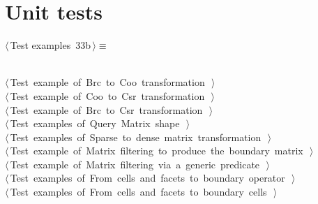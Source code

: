 \documentclass[11pt,oneside]{article}	%
\begin{document}

\section{Unit tests}


\begin{flushleft} \small \label{scrap57}
\protect{}$\langle\,$Test examples\nobreak\ {\footnotesize 33b}$\,\rangle\equiv$
\vspace{-1ex}
\begin{list}{}{} \item
\mbox{}\verb@@\\
\mbox{}\verb@@\hbox{$\langle\,$Test example of Brc to Coo transformation\nobreak\ {\footnotesize {}}$\,\rangle$}\verb@@\\
\mbox{}\verb@@\hbox{$\langle\,$Test example of Coo to Csr transformation\nobreak\ {\footnotesize {}}$\,\rangle$}\verb@@\\
\mbox{}\verb@@\hbox{$\langle\,$Test example of Brc to Csr transformation\nobreak\ {\footnotesize {}}$\,\rangle$}\verb@@\\
\mbox{}\verb@@\hbox{$\langle\,$Test examples of Query Matrix shape\nobreak\ {\footnotesize {}}$\,\rangle$}\verb@@\\
\mbox{}\verb@@\hbox{$\langle\,$Test examples of Sparse to dense matrix transformation\nobreak\ {\footnotesize {}}$\,\rangle$}\verb@@\\
\mbox{}\verb@@\hbox{$\langle\,$Test example of Matrix filtering to produce the boundary matrix\nobreak\ {\footnotesize {}}$\,\rangle$}\verb@@\\
\mbox{}\verb@@\hbox{$\langle\,$Test example of Matrix filtering via a generic predicate\nobreak\ {\footnotesize {}}$\,\rangle$}\verb@@\\
\mbox{}\verb@@\hbox{$\langle\,$Test examples of From cells and facets to boundary operator\nobreak\ {\footnotesize {}}$\,\rangle$}\verb@@\\
\mbox{}\verb@@\hbox{$\langle\,$Test examples of From cells and facets to boundary cells\nobreak\ {\footnotesize {}}$\,\rangle$}\verb@@\\

\end{list}
\end{flushleft}
\end{document}
